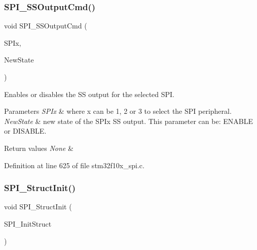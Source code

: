 \subsubsection{\texorpdfstring{S\+P\+I\+\_\+\+S\+S\+Output\+Cmd()}{SPI\_SSOutputCmd()}}
{\footnotesize\ttfamily void S\+P\+I\+\_\+\+S\+S\+Output\+Cmd (\begin{DoxyParamCaption}\item[{\hyperlink{struct_s_p_i___type_def}{S\+P\+I\+\_\+\+Type\+Def} $\ast$}]{S\+P\+Ix,  }\item[{\hyperlink{group___exported__types_gac9a7e9a35d2513ec15c3b537aaa4fba1}{Functional\+State}}]{New\+State }\end{DoxyParamCaption})}



Enables or disables the SS output for the selected S\+PI. 


\begin{DoxyParams}{Parameters}
{\em S\+P\+Ix} & where x can be 1, 2 or 3 to select the S\+PI peripheral. \\
\hline
{\em New\+State} & new state of the S\+P\+Ix SS output. This parameter can be\+: E\+N\+A\+B\+LE or D\+I\+S\+A\+B\+LE. \\
\hline
\end{DoxyParams}

\begin{DoxyRetVals}{Return values}
{\em None} & \\
\hline
\end{DoxyRetVals}


Definition at line 625 of file stm32f10x\+\_\+spi.\+c.

\mbox{\label{group___s_p_i___exported___functions_ga9a0116f88cc2c4478c270f05608703f1}} 
\subsubsection{\texorpdfstring{S\+P\+I\+\_\+\+Struct\+Init()}{SPI\_StructInit()}}
{\footnotesize\ttfamily void S\+P\+I\+\_\+\+Struct\+Init (\begin{DoxyParamCaption}\item[{\hyperlink{struct_s_p_i___init_type_def}{S\+P\+I\+\_\+\+Init\+Type\+Def} $\ast$}]{S\+P\+I\+\_\+\+Init\+Struct }\end{DoxyParamCaption})}



